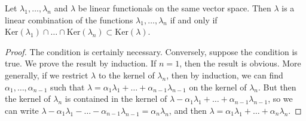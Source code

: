 \begin{lemma}
    Let $\lambda_1, \dots, \lambda_n$ and $\lambda$ be linear functionals on the same vector space. Then $\lambda$ is a linear combination of the functions $\lambda_1,\dots,\lambda_n$ if and only if $\text{Ker}(\lambda_1) \cap \dots \cap \text{Ker}(\lambda_n) \subset \text{Ker}(\lambda)$.
\end{lemma}
\begin{proof}
    The condition is certainly necessary. Conversely, suppose the condition is true. We prove the result by induction. If $n = 1$, then the result is obvious. More generally, if we restrict $\lambda$ to the kernel of $\lambda_n$, then by induction, we can find $\alpha_1, \dots, \alpha_{n-1}$ such that $\lambda = \alpha_1 \lambda_1 + \dots + \alpha_{n-1} \lambda_{n-1}$ on the kernel of $\lambda_n$. But then the kernel of $\lambda_n$ is contained in the kernel of $\lambda - \alpha_1 \lambda_1 + \dots + \alpha_{n-1} \lambda_{n-1}$, so we can write $\lambda - \alpha_1 \lambda_1 - \dots - \alpha_{n-1} \lambda_{n-1} = \alpha_n \lambda_n$, and then $\lambda = \alpha_1 \lambda_1 + \dots + \alpha_n \lambda_n$.
\end{proof}

